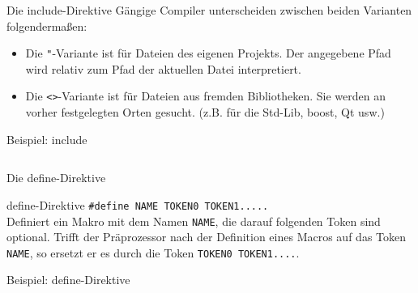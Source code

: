 \begin{frame}[fragile]{Die include-Direktive}
	Gängige Compiler unterscheiden zwischen beiden Varianten folgendermaßen:
	\begin{itemize}
		\item Die \verb|"|-Variante ist für Dateien des eigenen Projekts.
		      Der angegebene Pfad wird relativ zum Pfad der aktuellen Datei interpretiert.
		\item Die \verb|<>|-Variante ist für Dateien aus fremden Bibliotheken.
		      Sie werden an vorher festgelegten Orten gesucht. (z.B. für die Std-Lib, boost, Qt usw.)
	\end{itemize}
\end{frame}

\begin{frame}{Beispiel: include}
	\footnotesize
	
	
	\begin{columns}[t]
		
	\end{columns}
\end{frame}

\begin{frame}[fragile]{Die define-Direktive}
	\begin{block}{define-Direktive}
		\verb|#define NAME TOKEN0 TOKEN1.....| \\
		\vspace{0.5em}
		Definiert ein Makro mit dem Namen \verb|NAME|, die darauf folgenden Token sind optional. Trifft der Präprozessor nach der Definition eines Macros auf das Token \verb|NAME|, so ersetzt er es durch die Token \verb|TOKEN0 TOKEN1....|.
	\end{block}
\end{frame}

\begin{frame}{Beispiel: define-Direktive}
	\footnotesize
	
\end{frame}

